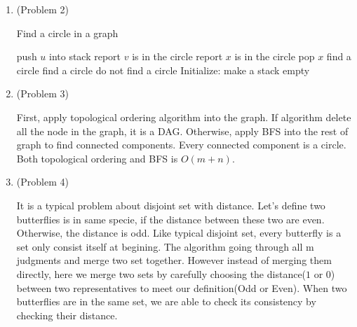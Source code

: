 \normalfont\documentclass[letterpaper,11pt]{article}
\begin{document}
\setlength{\parindent}{2ex}
\newcommand{\header}{
	\noindent {}
}

\bigskip
\header


	

\begin{enumerate}
\item (Problem 2)\par
\begin{algorithm*}
\caption{Find a circle in a graph}
\begin{algorithmic}
		\State push $u$ into stack
				\State report $v$ is in the circle
					\State report $x$ is in the circle
					\State pop $x$
				\EndWhile
				\State \Return find a circle
					\State \Return find a circle
				\EndIf
			\EndIf
		\EndFor
		\State \Return do not find a circle
	\EndFunction
	\State Initialize: make a stack empty
	\State {}
\end{algorithmic}
\end{algorithm*}
\item (Problem 3)\par
First, apply topological ordering algorithm into the graph. If algorithm delete all the node in the graph, it is a DAG. Otherwise, apply BFS into the rest of graph to find connected components. Every connected component is a circle. Both topological ordering and BFS is $O(m + n)$.
\item (Problem 4)\par
It is a typical problem about disjoint set with distance. Let's define two butterflies is in same specie, if the distance between these two are even. Otherwise, the distance is odd. Like typical disjoint set, every butterfly is a set only consist itself at begining. The algorithm going through all m judgments and merge two set together. However instead of merging them directly, here we merge two sets by carefully choosing the distance($1$ or $0$) between two representatives to meet our definition(Odd or Even). When two butterflies are in the same set, we are able to check its consistency by checking their distance.\par

\end{enumerate}
\end{document}

